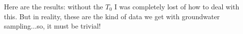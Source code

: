 \documentclass{article}
\begin{document}
\begin{figure}
	\label{fig:IMG_0578}
\end{figure}

\begin{figure}
	\label{fig:IMG_0576}
\end{figure}

\begin{figure}
	\label{fig:IMG_0579}
\end{figure}


\begin{figure}
	\label{fig:IMG_0577}
\end{figure}

Here are the results: without the $T_0$ I was completely lost of how to deal with this. But in reality, these are the kind of data we get with groundwater sampling...so, it must be trivial!
\end{document}
